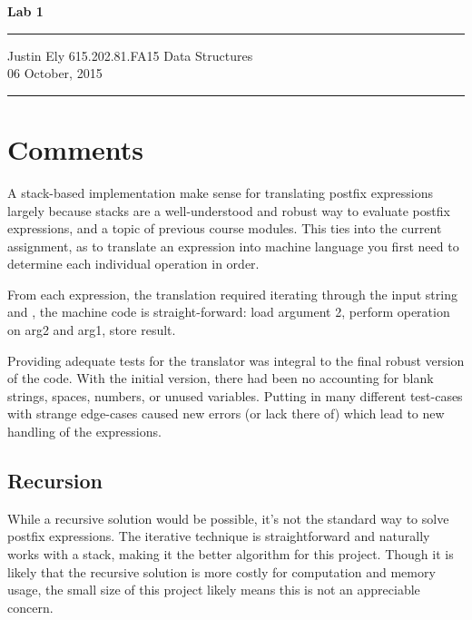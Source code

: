 \documentclass[a4paper,12pt]{article}
\begin{document}
\begin{flushright}

\vspace{1.1cm}

{\bf\Huge Lab 1}

\rule{0.25\linewidth}{0.5pt}

\vspace{0.5cm}
Justin Ely
\linebreak
\newline
\footnotesize{615.202.81.FA15 Data Structures \\}
\vspace{0.5cm}
06 October, 2015
\end{flushright}

\noindent\rule{\linewidth}{1.0pt}


\section{Comments}
A stack-based implementation make sense for translating postfix expressions largely because stacks are a well-understood
and robust way to evaluate postfix expressions, and a topic of previous course modules.  This ties into the current assignment, as to translate an expression into machine 
language you first need to determine each individual operation in order.  

From each expression, the translation required iterating through the input string and , the machine code is straight-forward: load argument 2, perform operation on arg2 and arg1, store result.  

Providing adequate tests for the translator was integral to the final robust version of the code.  With the initial version, there had been no 
accounting for blank strings, spaces, numbers, or unused variables.  Putting in many different test-cases with strange edge-cases caused
new errors (or lack there of) which lead to new handling of the expressions.

\subsection{Recursion}
While a recursive solution would be possible, it's not the standard way to solve postfix expressions.  The iterative technique
is straightforward and naturally works with a stack, making it the better algorithm for this project.  Though it is likely that the recursive 
solution is more costly for computation and memory usage, the small size of this project likely means this is not an appreciable 
concern.
\end{document}
